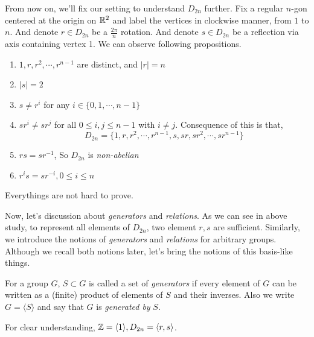 \documentclass[12pt, a4paper, openany, twoside]{book}
\theoremstyle{definition}
\theoremstyle{remark}
\theoremstyle{plain}
\numberwithin{equation}{section}
\begin{document}
From now on, we'll fix our setting to understand $D_{2n}$ further. Fix a regular $n$-gon centered at the origin on ${\mathbb {R}}^2$ and label the vertices in clockwise manner, from $1$ to $n$. 
And denote $r \in D_{2n}$ be a $\frac{2\pi}{n}$ rotation. And denote $s \in D_{2n}$ be a reflection via axis containing vertex 1. We can observe following propositions. 

\begin{tcolorbox}[colback=yellow!10!white,colframe=green!75!black,title=Propositions on $D_{2n}$]
\begin{enumerate}
    \item $1, r, r^2, \cdots, r^{n-1}$ are distinct, and $|r| = n$
    \item $|s| = 2$
    \item $s \neq r^{i}$ for any $i \in \{0, 1, \cdots, n-1\}$
    \item $sr^i \neq sr^j$ for all $0 \leq i, j \leq n-1$ with $i \neq j$. Consequence of this is that, 
    \[D_{2n} = \{1, r, r^2, \cdots, r^{n-1}, s, sr, sr^2, \cdots, sr^{n-1}\}\]
    \item $rs = sr^{-1}$, So $D_{2n}$ is \textit{non-abelian}
    \item $r^i s = sr^{-i}, 0 \leq i \leq n$
\end{enumerate}

Everythings are not hard to prove. 

\end{tcolorbox}

Now, let's discussion about \textit{generators} and \textit{relations}. As we can see in above study, 
to represent all elements of $D_{2n}$, two element $r, s$ are sufficient. Similarly, we introduce the notions of \textit{generators} and \textit{relations} for arbitrary groups. 
Although we recall both notions later, let's bring the notions of this basis-like things. 

\begin{tcolorbox}[colback=yellow!10!white,colframe=brown!75!black,title=Generator of $G$]

For a group $G$, $S \subset G$ is called a set of \textit{generators} if every element of $G$ can be written 
as a (finite) product of elements of $S$ and their inverses. Also we write $G = \langle S \rangle$ and say that 
$G$ is \textit{generated by} $S$. 

\end{tcolorbox}

For clear understanding, ${\mathbb {Z}} = \langle 1 \rangle, D_{2n} = \langle r, s \rangle$. 
\end{document}
